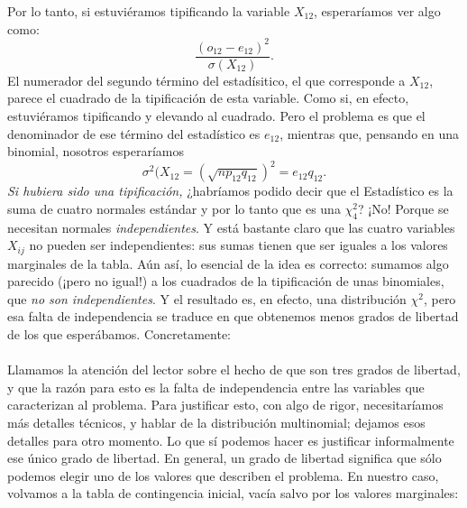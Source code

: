 \begin{itemize}
        Por lo tanto, si estuviéramos tipificando la variable $X_{12}$, esperaríamos ver algo como:
        \[\dfrac{(o_{12}-e_{12})^2}{\sigma(X_{12})}.\]
        El numerador del segundo término del estadísitico, el que corresponde a $X_{12}$, parece el cuadrado de la tipificación de esta variable. Como si, en efecto, estuviéramos tipificando y elevando al cuadrado. Pero el problema es que el denominador de ese término del estadístico es $e_{12}$, mientras que, pensando en una binomial, nosotros esperaríamos
        \[\sigma^2(X_{12}=\left(\sqrt{n p_{12} q_{12}}\right)^2=e_{12} q_{12}.\]
        {\em Si hubiera sido una tipificación,} ¿habríamos podido decir que el Estadístico es la suma de cuatro normales estándar y por lo tanto que es una $\chi^2_4$? ¡No! Porque se necesitan normales {\em independientes}. Y está bastante claro que las cuatro variables $X_{ij}$ no pueden ser independientes: sus sumas tienen que ser iguales a los valores marginales de la tabla.  Aún así, lo esencial de la idea es correcto: sumamos algo parecido (¡pero no igual!) a los cuadrados de la tipificación de unas binomiales, que {\em no son independientes}. Y el resultado es, en efecto, una distribución $\chi^2$, pero esa falta de independencia se traduce en que obtenemos menos grados de libertad de los que esperábamos. Concretamente:\\[3mm]
        \\[3mm]
        Llamamos la atención del lector sobre el hecho de que son tres grados de libertad, y que la razón para esto es la falta de independencia entre las variables que caracterizan al problema. Para justificar esto, con algo de rigor, necesitaríamos más detalles técnicos, y hablar de la distribución multinomial; dejamos esos detalles para otro momento. Lo que sí podemos hacer es justificar informalmente ese único grado de libertad. En general, un grado de libertad significa que sólo podemos elegir uno de los valores que describen el problema. En nuestro caso, volvamos a la tabla de contingencia inicial, vacía salvo por los valores marginales:

\end{itemize}
